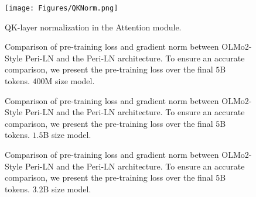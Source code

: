\begin{figure}[ht!]
    \centering
        \texttt{[image: Figures/QKNorm.png]}
    \caption{QK-layer normalization in the Attention module.}
    \label{fig:qk-norm}
\end{figure}

\begin{figure}[ht!]
    \centering
    \caption{Comparison of pre-training loss and gradient norm between OLMo2-Style Peri-LN and the Peri-LN architecture. To ensure an accurate comparison, we present the pre-training loss over the final $5$B tokens. $400$M size model.}
    \label{fig:olmo_400M}
\end{figure}

\newpage

\begin{figure}[ht!]
    \centering
    \caption{Comparison of pre-training loss and gradient norm between OLMo2-Style Peri-LN and the Peri-LN architecture. To ensure an accurate comparison, we present the pre-training loss over the final $5$B tokens. $1.5$B size model.}
    \label{fig:olmo_1B}
\end{figure}


\begin{figure}[ht!]
    \centering
    \caption{Comparison of pre-training loss and gradient norm between OLMo2-Style Peri-LN and the Peri-LN architecture. To ensure an accurate comparison, we present the pre-training loss over the final $5$B tokens. $3.2$B size model.}
    \label{fig:olmo_3B}
\end{figure}


